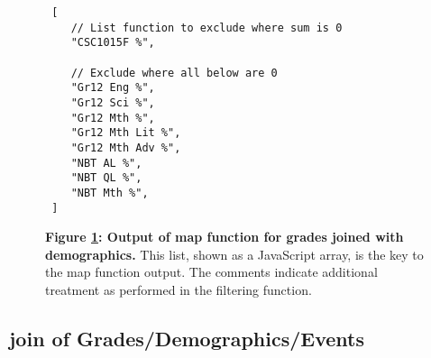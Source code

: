 \begin{figure}[ht]
    \centering
    \begin{verbatim}
 [
    // List function to exclude where sum is 0
    "CSC1015F %",

    // Exclude where all below are 0 
    "Gr12 Eng %", 
    "Gr12 Sci %",
    "Gr12 Mth %",
    "Gr12 Mth Lit %",
    "Gr12 Mth Adv %",
    "NBT AL %",
    "NBT QL %",
    "NBT Mth %",
 ]    
    \end{verbatim}
    \caption[Analysis 1: Grades joined with Demographics]{\textbf{Figure \ref{grades-join-demographics-output}: Output of map function for grades joined with demographics.} This list, shown as a JavaScript array, is the key to the map function output. The comments indicate additional treatment as performed in the filtering function.}
    \label{grades-join-demographics-output}
\end{figure}





\subsection{join of Grades/Demographics/Events}


